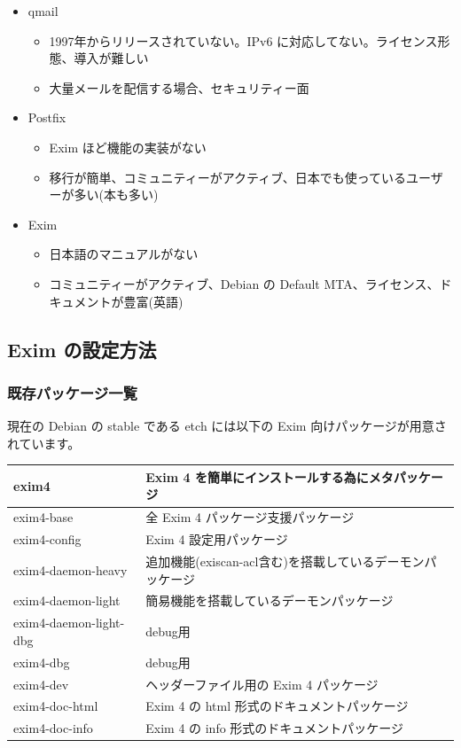 \documentclass[mingoth,a4paper]{jsarticle}
\begin{document}
\begin{itemize}
\item qmail
 \begin{itemize}
 \item 1997年からリリースされていない。IPv6 に対応してない。ライセンス形態、導入が難しい
 \item 大量メールを配信する場合、セキュリティー面
 \end{itemize}

\item Postfix
 \begin{itemize}
 \item Exim ほど機能の実装がない
 \item 移行が簡単、コミュニティーがアクティブ、日本でも使っているユーザーが多い(本も多い)
 \end{itemize}

\item Exim
 \begin{itemize}
 \item 日本語のマニュアルがない
 \item コミュニティーがアクティブ、Debian の Default MTA、ライセンス、ドキュメントが豊富(英語)
 \end{itemize}
\end{itemize}

\subsection{Exim の設定方法}
\subsubsection{既存パッケージ一覧}
現在の Debian の stable である etch には以下の Exim 向けパッケージが用意されています。

\begin{tabular}[htb]{|l|l|} \hline
exim4&Exim 4 を簡単にインストールする為にメタパッケージ\\ \hline
exim4-base&全 Exim 4 パッケージ支援パッケージ\\ \hline
exim4-config&Exim 4 設定用パッケージ \\ \hline
exim4-daemon-heavy&追加機能(exiscan-acl含む)を搭載しているデーモンパッケージ\\ \hline
exim4-daemon-light&簡易機能を搭載しているデーモンパッケージ\\ \hline
exim4-daemon-light-dbg&debug用\\ \hline
exim4-dbg&debug用\\ \hline
exim4-dev&ヘッダーファイル用の Exim 4 パッケージ \\ \hline
exim4-doc-html&Exim 4 の html 形式のドキュメントパッケージ\\ \hline
exim4-doc-info& Exim 4 の info 形式のドキュメントパッケージ\\ \hline
\end{tabular}
\end{document}

